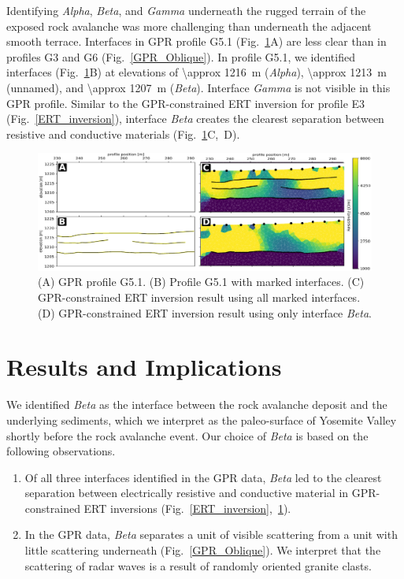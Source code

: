 \documentclass[utf8]{frontiersSCNS}
\begin{document}
Identifying \emph{Alpha}, \emph{Beta}, and \emph{Gamma} underneath the rugged terrain of the exposed rock avalanche was more challenging than underneath the adjacent smooth terrace. Interfaces in GPR profile G5.1 (Fig.~\ref{Combined_ABCD}A) are less clear than in profiles G3 and G6 (Fig.~\ref{GPR_Oblique}). In profile G5.1, we identified interfaces (Fig.~\ref{Combined_ABCD}B) at elevations of \SI{\approx 1216}{m} (\emph{Alpha}), \SI{\approx 1213}{m} (unnamed), and \SI{\approx 1207}{m} (\emph{Beta}). Interface \emph{Gamma} is not visible in this GPR profile. Similar to the GPR-constrained ERT inversion for profile E3 (Fig.~\ref{ERT_inversion}), interface \emph{Beta} creates the clearest separation between resistive and conductive materials (Fig.~\ref{Combined_ABCD}C,~D).  

                                \begin{figure}

	\includegraphics[width=\textwidth]{Figures/Combined_ABCD.pdf}
		\caption{(A) GPR profile G5.1. (B) Profile G5.1 with marked interfaces. (C) GPR-constrained ERT inversion result using all marked interfaces. (D) GPR-constrained ERT inversion result using only interface \emph{Beta}. \label{Combined_ABCD}}

								   \end{figure}


\section{Results and Implications}\label{sec:results}

We identified \emph{Beta} as the interface between the rock avalanche deposit and the underlying sediments, which we interpret as the paleo-surface of Yosemite Valley shortly before the rock avalanche event. Our choice of \emph{Beta} is based on the following observations.

\begin{enumerate}
\item Of all three interfaces identified in the GPR data, \emph{Beta} led to the clearest separation between electrically resistive and conductive material in GPR-constrained ERT inversions (Fig.~\ref{ERT_inversion},~\ref{Combined_ABCD}).
\item In the GPR data, \emph{Beta} separates a unit of visible scattering from a unit with little scattering underneath (Fig.~\ref{GPR_Oblique}). We interpret that the scattering of radar waves is a result of randomly oriented granite clasts. 
\end{enumerate}
\end{document}
